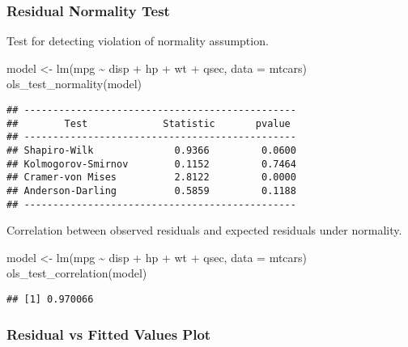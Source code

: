 \documentclass[
]{article}
\newenvironment{Shaded}{\begin{snugshade}}{\end{snugshade}}
\newcommand{\AttributeTok}[1]{\textcolor[rgb]{0.77,0.63,0.00}{#1}}
\newcommand{\FunctionTok}[1]{\textcolor[rgb]{0.00,0.00,0.00}{#1}}
\newcommand{\NormalTok}[1]{#1}
\newcommand{\OtherTok}[1]{\textcolor[rgb]{0.56,0.35,0.01}{#1}}
\newcommand{\SpecialCharTok}[1]{\textcolor[rgb]{0.00,0.00,0.00}{#1}}
\begin{document}
\hypertarget{residual-normality-test}{%
\subsubsection{Residual Normality Test}\label{residual-normality-test}}

Test for detecting violation of normality assumption.

\begin{Shaded}
\begin{Highlighting}[]
\NormalTok{model }\OtherTok{\textless{}{-}} \FunctionTok{lm}\NormalTok{(mpg }\SpecialCharTok{\textasciitilde{}}\NormalTok{ disp }\SpecialCharTok{+}\NormalTok{ hp }\SpecialCharTok{+}\NormalTok{ wt }\SpecialCharTok{+}\NormalTok{ qsec, }\AttributeTok{data =}\NormalTok{ mtcars)}
\FunctionTok{ols\_test\_normality}\NormalTok{(model)}
\end{Highlighting}
\end{Shaded}

\begin{verbatim}
## -----------------------------------------------
##        Test             Statistic       pvalue  
## -----------------------------------------------
## Shapiro-Wilk              0.9366         0.0600 
## Kolmogorov-Smirnov        0.1152         0.7464 
## Cramer-von Mises          2.8122         0.0000 
## Anderson-Darling          0.5859         0.1188 
## -----------------------------------------------
\end{verbatim}

Correlation between observed residuals and expected residuals under
normality.

\begin{Shaded}
\begin{Highlighting}[]
\NormalTok{model }\OtherTok{\textless{}{-}} \FunctionTok{lm}\NormalTok{(mpg }\SpecialCharTok{\textasciitilde{}}\NormalTok{ disp }\SpecialCharTok{+}\NormalTok{ hp }\SpecialCharTok{+}\NormalTok{ wt }\SpecialCharTok{+}\NormalTok{ qsec, }\AttributeTok{data =}\NormalTok{ mtcars)}
\FunctionTok{ols\_test\_correlation}\NormalTok{(model)}
\end{Highlighting}
\end{Shaded}

\begin{verbatim}
## [1] 0.970066
\end{verbatim}

\hypertarget{residual-vs-fitted-values-plot-1}{%
\subsubsection{Residual vs Fitted Values
Plot}\label{residual-vs-fitted-values-plot-1}}
\end{document}
